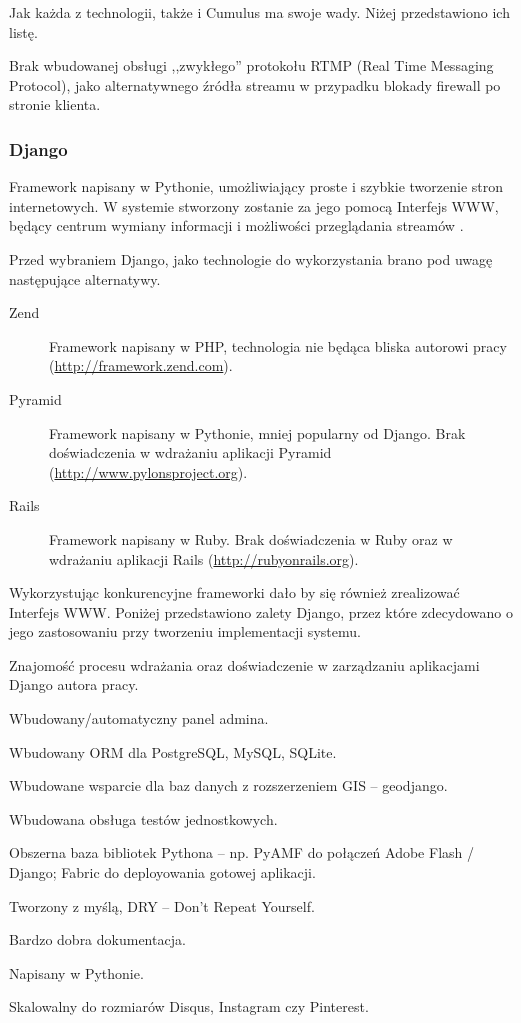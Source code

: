 Jak każda z technologii, także i Cumulus ma swoje wady. Niżej przedstawiono ich listę.
\begin{packed_item}
    \item{Brak wbudowanej obsługi ,,zwykłego'' protokołu RTMP (Real Time Messaging Protocol), jako alternatywnego źródła streamu w przypadku blokady firewall po stronie klienta.}
\end{packed_item}

\newpage
\subsubsection{Django}
Framework napisany w Pythonie, umożliwiający proste i szybkie tworzenie stron internetowych. W systemie stworzony zostanie za jego pomocą Interfejs WWW, będący centrum wymiany informacji i możliwości przeglądania streamów \cite{Django}.

Przed wybraniem Django, jako technologie do wykorzystania brano pod uwagę następujące alternatywy.
\begin{description}
    \item[Zend] Framework napisany w PHP, technologia nie będąca bliska autorowi pracy (\url{http://framework.zend.com}). 
    \item[Pyramid] Framework napisany w Pythonie, mniej popularny od Django. Brak doświadczenia w wdrażaniu aplikacji Pyramid (\url{http://www.pylonsproject.org}).
    \item[Rails] Framework napisany w Ruby. Brak doświadczenia w Ruby oraz w wdrażaniu aplikacji Rails (\url{http://rubyonrails.org}).
\end{description}

Wykorzystując konkurencyjne frameworki dało by się również zrealizować Interfejs WWW. Poniżej przedstawiono zalety Django, przez które zdecydowano o jego zastosowaniu przy tworzeniu implementacji systemu.
\begin{packed_item}
    \item{Znajomość procesu wdrażania oraz doświadczenie w zarządzaniu aplikacjami Django autora pracy.}
    \item{Wbudowany/automatyczny panel admina.}
    \item{Wbudowany ORM dla PostgreSQL, MySQL, SQLite.}
    \item{Wbudowane wsparcie dla baz danych z rozszerzeniem GIS -- geodjango.}
    \item{Wbudowana obsługa testów jednostkowych.}
    \item{Obszerna baza bibliotek Pythona -- np. PyAMF do połączeń Adobe Flash / Django; Fabric do deployowania gotowej aplikacji.}
    \item{Tworzony z myślą, DRY -- Don't Repeat Yourself.}
    \item{Bardzo dobra dokumentacja.}
    \item{Napisany w Pythonie.}
    \item{Skalowalny do rozmiarów Disqus, Instagram czy Pinterest.}
\end{packed_item}

